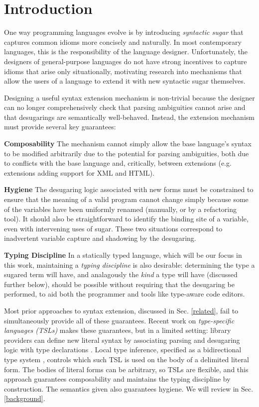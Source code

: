 \documentclass{sig-alternate}[10pt]
\begin{document}
\section{Introduction}
\label{sec-intro}
One way programming languages evolve is by introducing \emph{syntactic sugar} that captures common idioms more concisely and naturally. In most contemporary languages, this is the  responsibility of the language designer. Unfortunately, the designers of general-purpose languages do not have strong incentives to capture idioms that arise only situationally, motivating research into mechanisms that allow the users of a language to extend it with new syntactic sugar themselves.%

Designing a useful syntax extension mechanism is non-trivial because the designer can no longer  comprehensively check that parsing ambiguities cannot arise and that desugarings are semantically well-behaved. Instead, the extension mechanism must provide several key guarantees:


\textbf{Composability} The mechanism cannot simply allow the base language's syntax to  be modified arbitrarily due to the potential for parsing ambiguities, both due to conflicts with the base language and, critically, between extensions (e.g. extensions adding support for XML and HTML).%


\textbf{Hygiene} The desugaring logic associated with new forms must be constrained to ensure that the meaning of a valid program cannot change simply because some of the variables have been uniformly renamed (manually, or by a refactoring tool). It should also be straightforward to identify the binding site of a variable, even with intervening uses of sugar. These two situations correspond to inadvertent variable capture and shadowing by the desugaring. 


\textbf{Typing Discipline} In a statically typed language, which will be our focus in this work, maintaining a \emph{typing discipline} is also desirable: determining the type a sugared term will have, and analagously the \emph{kind} a type will have (discussed further below), should be possible without requiring that the desugaring be performed, to aid both the programmer and tools like type-aware code editors. 

Most prior approaches to syntax extension, discussed in Sec. \ref{related}, fail to simultaneously provide all of these guarantees. Recent work on \emph{type-specific languages  (TSLs)} makes these guarantees, but in a limited setting: library providers can define new literal syntax by associating parsing and desugaring logic with type declarations \cite{TSLs}. Local type inference, specified as a bidirectional type system \cite{Pierce:2000:LTI:345099.345100}, controls which such TSL is used on the  body of a delimited literal form. The bodies of literal forms can be arbitrary, so TSLs are flexible, and this approach guarantees composability and maintains the typing discipline by construction. The semantics given also guarantees hygiene. We will review in Sec. \ref{background}. 
\end{document}
